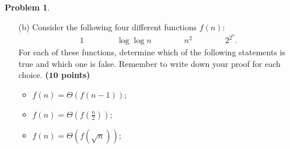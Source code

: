 \documentclass{article}
\theoremstyle{definition}
\newtheorem{problem}{Problem}
\def\fline{\rule{0.75\linewidth}{0.5pt}}
\newcommand{\finishline}{\begin{center}\fline\end{center}}
\newtheorem*{solution*}{Solution}
\newenvironment{solution}{\begin{solution*}}{{\finishline} \end{solution*}}
\newcommand{\grade}[1]{\hfill{\textbf{($\mathbf{#1}$ points)}}}
\begin{document}
\begin{problem}
\begin{enumerate}
\begin{solution}
	Slowest to Fastest Growth:
	\begin{enumerate}
	\item $3^{3^{3^{3}}}$
	\item $\log n$
	\item $\sqrt{n}$
	\item $\frac{n}{\log^2{n}}$
	\item $100n$
	\item $n^{\log n}$
	\item $2^n$
	\item $9^n$
	\item $n!$
	\end{enumerate}

	Proofs:
	\begin{itemize}
	\item $3^{3^{3^{3}}}$ - Constant, doesn’t grow as n increases
	\item $\log{n}$: Proof: $(\log{n})^c = o(n)$ for any constant $c \geq 1$. Let $c = 2$, then $(\log{n})^2 = o(n)$. This implies $\log{n} = o(\sqrt{n})$ > $\log{n} = O(\sqrt{n})$.
	\item $\sqrt{n}$: Proof: $\sqrt{n}$ grows slower than $n$ but faster than $\log{n}$.
	\item $\frac{n}{\log^2{n}}$: Proof: This grows slower than $n$ (due to division by $\log^2{n}$) but faster than $\sqrt{n}$. $\lim_{n \to \infty} \frac{n/\log^2{n}}{\sqrt{n}} = \lim_{n \to \infty} \frac{\sqrt{n}}{\log^2{n}} = \infty$.
	\item $100n$: Proof: $100n = \Theta(n)$, as constant factors don't affect asymptotic growth.
	\item $n^{\log{n}}$: Proof: $n^{\log{n}} = 2^{\log{n} \cdot \log{n}} = 2^{\log^2{n}}$, which grows faster than $n$ but slower than $2^n$.
	\item $2^n$: Proof: Exponential growth, faster than polynomial ($n^k$ for any $k$) but slower than $3^n$.
	\item $9^n$: Proof: $9^n = (3^2)^n = 3^{2n}$, which grows faster than $2^n$ but slower than $n!$.
	\item $n!$: Proof: $n! > 9^n$ for sufficiently large $n$, so it grows faster than all previous functions.
	\end{itemize}
\end{solution}
	
	\item[(b)]  Consider the following four different functions $f(n)$: 
	  \begin{align*}
	    1 \qquad\qquad  \log\log{n} \qquad\qquad  n^2  \qquad\qquad 2^{2^{n}}.
	  \end{align*} 
	 For each of these functions, determine which of the following statements is true and which one is false. Remember to write down your proof for each choice.    \grade{10} 
	\begin{itemize}
        \item $f(n) = \Theta(f(n-1))$;
        \item $f(n) = \Theta(f(\frac{n}{2}))$;
        \item $f(n) = \Theta(f(\sqrt n))$;
    \end{itemize}
    

\end{enumerate}
\end{problem}
\end{document}
